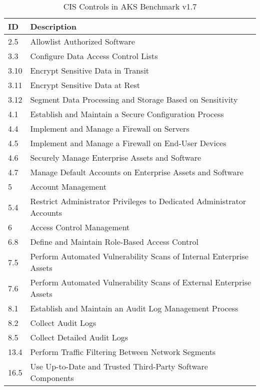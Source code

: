 \begin{table}[ht]
  \caption{CIS Controls in AKS Benchmark v1.7}
    \begin{tabular}{| l | l |}
    \hline
    ID & Description \\
    \hline\hline
    2.5 & Allowlist Authorized Software \\
    \hline
    3.3 & Configure Data Access Control Lists \\
    \hline
    3.10 & Encrypt Sensitive Data in Transit \\
    \hline
    3.11 & Encrypt Sensitive Data at Rest \\
    \hline
    3.12 & Segment Data Processing and Storage Based on Sensitivity \\
    \hline
    4.1 & Establish and Maintain a Secure Configuration Process \\
    \hline
    4.4 & Implement and Manage a Firewall on Servers \\
    \hline
    4.5 & Implement and Manage a Firewall on End-User Devices \\
    \hline
    4.6 & Securely Manage Enterprise Assets and Software \\
    \hline
    4.7 & Manage Default Accounts on Enterprise Assets and Software \\
    \hline
    5 & Account Management \\
    \hline
    5.4 & Restrict Administrator Privileges to Dedicated Administrator Accounts \\
    \hline
    6 & Access Control Management \\
    \hline
    6.8 & Define and Maintain Role-Based Access Control \\
    \hline
    7.5 & Perform Automated Vulnerability Scans of Internal Enterprise Assets \\
    \hline
    7.6 & Perform Automated Vulnerability Scans of External  Enterprise Assets \\
    \hline
    8.1 & Establish and Maintain an Audit Log Management Process \\
    \hline
    8.2 & Collect Audit Logs \\
    \hline
    8.5 & Collect Detailed Audit Logs \\
    \hline
    13.4 & Perform Traffic Filtering Between Network Segments \\
    \hline
    16.5 & Use Up-to-Date and Trusted Third-Party Software Components \\
    \hline
    \end{tabular}%
  \label{tab:aksBenchmark}%
\end{table}%

